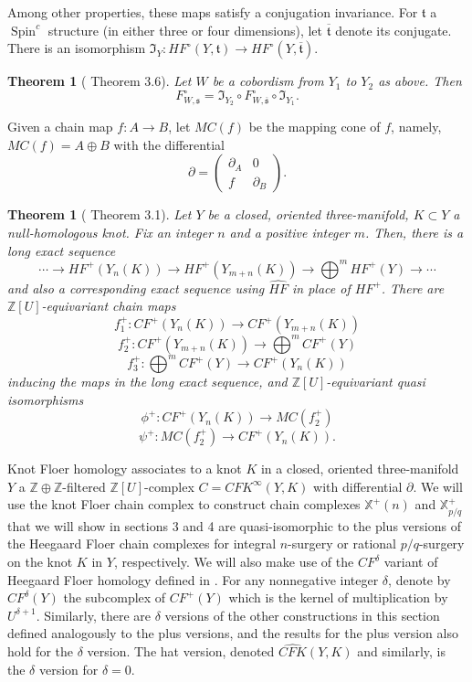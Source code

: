 \documentclass{article}
\newtheorem{theorem}[equation]{Theorem}
\theoremstyle{remark}
\numberwithin{equation}{section}
\numberwithin{table}{section}
\newcommand{\wh}{\widehat}
\renewcommand{\frak}{\mathfrak}
\DeclareMathOperator{\Spin}{Spin}
\renewcommand{\(}{\left(}
\renewcommand{\)}{\right)}
\newcommand{\Z}{{\mathbb{Z}}}
\newcommand{\X}{{\mathbb{X}}}
\begin{document}
Among other properties, these maps satisfy a conjugation invariance. For $\frak t$ a $\Spin^c$ structure (in either three or four dimensions), let $\overline{\frak t}$ denote its conjugate. There is an isomorphism $\frak I_Y:HF^\circ(Y,\frak t)\to HF^\circ(Y,\overline{\frak t})$.

\begin{theorem}[\cite{oz-sz-4-mflds} Theorem 3.6]\label{thm:conjugation-invariance}
Let $W$ be a cobordism from $Y_1$ to $Y_2$ as above. Then
$$F_{W,\frak s}^\circ=\frak I_{Y_2}\circ F_{W,\overline{\frak s}}^\circ \circ\frak I_{Y_1}.$$
\end{theorem}


Given a chain map $f:A\to B$, let $MC(f)$ be the mapping cone of $f$, namely, $MC(f)=A\oplus B$ with the differential
$$\partial=\begin{pmatrix}
    \partial_A & 0 \\
    f & \partial_B
\end{pmatrix}.$$

\begin{theorem}[\cite{oz-sz-integer} Theorem 3.1]\label{thm:oz-sz-les}
Let $Y$ be a closed, oriented three-manifold, $K\subset Y$ a null-homologous knot. Fix an integer $n$ and a positive integer $m$. Then, there is a long exact sequence
$$\cdots\to HF^+(Y_n(K))\to HF^+(Y_{m+n}(K))\to\bigoplus^m HF^+(Y)\to\cdots$$ and also a corresponding exact sequence using $\widehat{HF}$ in place of $HF^+$. There are $\Z[U]$-equivariant chain maps
$$f_1^+:CF^+(Y_n(K))\to CF^+(Y_{m+n}(K))$$
$$f_2^+:CF^+(Y_{m+n}(K))\to\bigoplus^m CF^+(Y)$$
$$f_3^+:\bigoplus^m CF^+(Y)\to CF^+(Y_n(K))$$
inducing the maps in the long exact sequence, and $\Z[U]$-equivariant quasi isomorphisms
$$\phi^+: CF^+(Y_n(K))\to MC(f_2^+)$$
$$\psi^+: MC(f_2^+)\to CF^+(Y_n(K)).$$
\end{theorem}


Knot Floer homology associates to a knot $K$ in a closed, oriented three-manifold $Y$ a $\Z\oplus\Z$-filtered $\Z[U]$-complex $C=CFK^\infty(Y,K)$ with differential $\partial$. We will use the knot Floer chain complex to construct chain complexes $\X^+(n)$ and $\X^+_{p/q}$ that we will show in sections 3 and 4 are quasi-isomorphic to the plus versions of the Heegaard Floer chain complexes for integral $n$-surgery or rational $p/q$-surgery on the knot $K$ in $Y$, respectively. We will also make use of the $CF^\delta$ variant of Heegaard Floer homology defined in \cite{oz-sz-integer}. For any nonnegative integer $\delta$, denote by $CF^\delta(Y)$ the subcomplex of $CF^+(Y)$ which is the kernel of multiplication by $U^{\delta+1}$. Similarly, there are $\delta$ versions of the other constructions in this section defined analogously to the plus versions, and the results for the plus version also hold for the $\delta$ version. The hat version, denoted $\wh{CFK}(Y,K)$ and similarly, is the $\delta$ version for $\delta=0$. 
\end{document}
